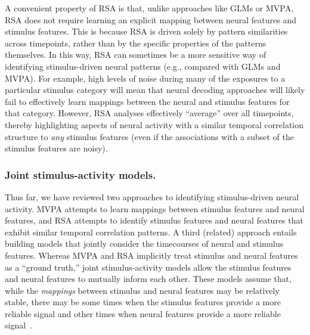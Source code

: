 \documentclass[runningheads]{llncs}
\begin{document}
A convenient property of RSA is that, unlike approaches like GLMs or
MVPA, RSA does not require learning an explicit mapping between neural
features and stimulus features.  This is because RSA is driven solely
by pattern similarities across timepoints, rather than by the specific
properties of the patterns themselves.  In this way, RSA can sometimes
be a more sensitive way of identifying stimulus-driven neural patterns
(e.g., compared with GLMs and MVPA).  For example, high levels of
noise during many of the exposures to a particular stimulus category
will mean that neural decoding approaches will likely fail to
effectively learn mappings between the neural and stimulus features
for that category.  However, RSA analyses effectively ``average'' over
all timepoints, thereby highlighting aspects of neural activity with a
similar temporal correlation structure to \textit{any} stimulus
features (even if the associations with a subset of the stimulus
features are noisy).

\subsubsection{Joint stimulus-activity models.}
Thus far, we have reviewed two approaches to identifying
stimulus-driven neural activity.  MVPA attempts to learn mappings
between stimulus features and neural features, and RSA attempts to
identify stimulus features and neural features that exhibit similar
temporal correlation patterns.  A third (related) approach entails
building models that jointly consider the timecourses of neural and
stimulus features.  Whereas MVPA and RSA implicitly treat stimulus and
neural features as a ``ground truth,'' joint stimulus-activity models
allow the stimulus features and neural features to mutually inform
each other.  These models assume that, while the \textit{mappings}
between stimulus and neural features may be relatively stable, there
may be some times when the stimulus features provide a more reliable
signal and other times when neural features provide a more reliable
signal~\citep{TurnEtal13}.
\end{document}
